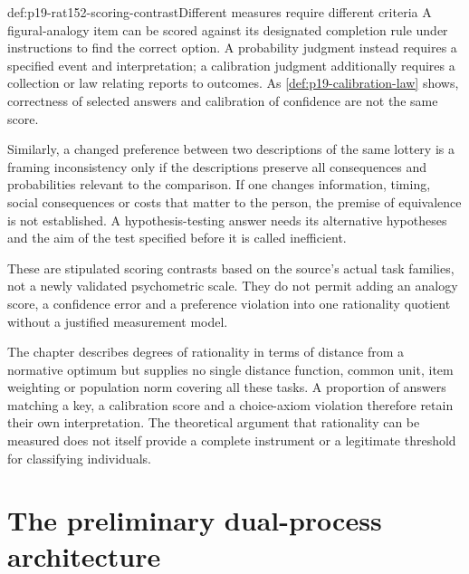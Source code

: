 \begin{hbexample}{def:p19-rat152-scoring-contrast}{Different measures require different criteria}
A figural-analogy item can be scored against its designated completion
rule under instructions to find the correct option. A probability judgment
instead requires a specified event and interpretation; a calibration
judgment additionally requires a collection or law relating reports to
outcomes. As \cref{def:p19-calibration-law} shows, correctness of selected
answers and calibration of confidence are not the same score.

Similarly, a changed preference between two descriptions of the same lottery
is a framing inconsistency only if the descriptions preserve all consequences
and probabilities relevant to the comparison. If one changes information,
timing, social consequences or costs that matter to the person, the premise
of equivalence is not established. A hypothesis-testing answer needs its
alternative hypotheses and the aim of the test specified before it is
called inefficient.

These are stipulated scoring contrasts based on the source's actual task
families, not a newly validated psychometric scale. They do not permit
adding an analogy score, a confidence error and a preference violation
into one rationality quotient without a justified measurement model.
\end{hbexample}

The chapter describes degrees of rationality in terms of distance from a
normative optimum but supplies no single distance function, common unit,
item weighting or population norm covering all these tasks. A proportion
of answers matching a key, a calibration score and a choice-axiom violation
therefore retain their own interpretation. The theoretical argument that
rationality can be measured does not itself provide a complete instrument
or a legitimate threshold for classifying individuals.

\section{The preliminary dual-process architecture}
\label{sec:p19-rat152-dual}

